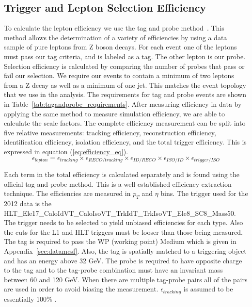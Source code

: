 \subsection{Trigger and Lepton Selection Efficiency}

To calculate the lepton efficiency we use the tag and probe method~\cite{TagandProbe2012}. This method allows the determination of a variety of efficiencies by using a data sample of pure leptons from Z boson decays.  For each event one of the leptons must pass our tag criteria, and is labeled as a tag.  The other lepton is our probe. Selection efficiency is calculated by comparing the number of probes that pass or fail our selection. We require our events to contain a minimum of two leptons from a Z decay as well as a minimum of one jet.  This matches the event topology that we use in the analysis. The requirements for tag and probe events are shown in Table~\ref{tab:tagandprobe_requirements}. After measuring efficiency in data by applying the same method to measure simulation efficiency, we are able to calculate the scale factors. The complete efficiency measurement can be split into five relative measurements: tracking efficiency, reconstruction efficiency, identification efficiency, isolation efficiency, and the total trigger efficiency.  This is expressed in equation (\ref{eq:efficiency_eq}).
\begin{equation}
\epsilon_{lepton} = \epsilon_{tracking} \times \epsilon_{RECO/tracking} \times \epsilon_{ID/RECO} \times \epsilon_{ISO/ID} \times \epsilon_{trigger/ISO}
\label{eq:efficiency_eq}
\end{equation}

Each term in the total efficiency is calculated separately and is found using the official tag-and-probe method. This is a well established efficiency extraction technique. The efficiencies are measured in $p_T$ and $\eta$ bins. The trigger used for the 2012 data is the HLT\_Ele17\_CaloIdVT\_CaloIsoVT\_TrkIdT\_TrkIsoVT\_Ele8\_SC8\_Mass50. The trigger needs to be selected to yield unbiased efficiencies for each type. Also the cuts for the L1 and HLT triggers must be looser than those being measured. The tag is required to pass the WP (working point) Medium which is given in Appendix~\ref{sec:datamcsf}. Also, the tag is spatially matched to a triggering object and has an energy above 32 GeV. The probe is required to have opposite charge to the tag and to the tag-probe combination must have an invariant mass between 60 and 120 GeV.  When there are multiple tag-probe pairs all of the pairs are used in order to avoid biasing the measurement. $\epsilon_{tracking}$ is assumed to be essentially 100\% \cite{WandZCrossSections}.

